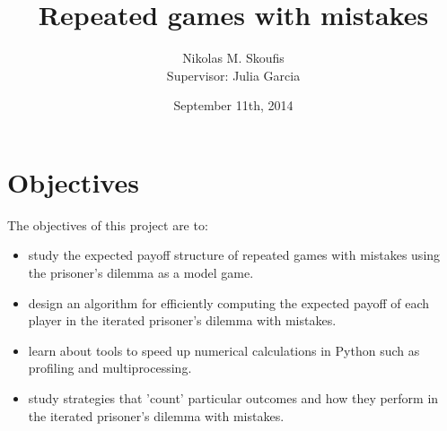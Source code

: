 \documentclass[a4paper,11pt]{article}
\begin{document}
\title{Repeated games with mistakes}
\author{Nikolas M. Skoufis \\ Supervisor: Julia Garcia}
\date{September 11th, 2014}

\maketitle

\section*{Objectives}

The objectives of this project are to:

\begin{itemize}

    \item study the expected payoff structure of repeated games with mistakes using the prisoner's dilemma as a model game.
    \item design an algorithm for efficiently computing the expected payoff of each player in the iterated prisoner's dilemma with mistakes.
    \item learn about tools to speed up numerical calculations in Python such as profiling and multiprocessing.
    \item study strategies that 'count' particular outcomes and how they perform in the iterated prisoner's dilemma with mistakes.

\end{itemize}
\end{document}
